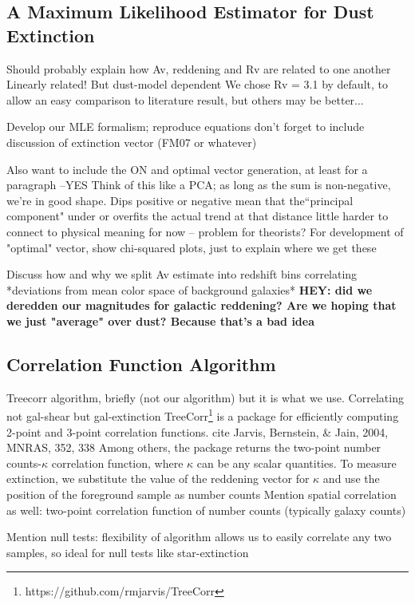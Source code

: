 \documentclass[11pt, oneside]{article}   	%
\begin{document}
\subsection{A Maximum Likelihood Estimator for Dust Extinction}
\begin{outline}
\1 Should probably explain how Av, reddening and Rv are related to one another
\2 Linearly related! But dust-model dependent
\2 We chose Rv = 3.1 by default, to allow an easy comparison to literature result, but others may be better...

\1 Develop our MLE formalism; reproduce equations
	\2 don't forget to include discussion of extinction vector (FM07 or whatever)
	
\1 Also want to include the ON and optimal vector generation, at least for a paragraph --YES
	\2 Think of this like a PCA; as long as the sum is non-negative, we're in good shape. 
	\2 Dips positive or negative mean that the``principal component" under or overfits the actual trend at that distance
		\3 little harder to connect to physical meaning for now -- problem for theorists?
	\2 For development of "optimal" vector, show chi-squared plots, just to explain where we get these 
	
\1 Discuss how and why we split Av estimate into redshift bins
	\2 correlating *deviations from mean color space of background galaxies*
	\2 \textbf{HEY: did we deredden our magnitudes for galactic reddening? Are we hoping that we just "average" over dust? Because that's a bad idea}

\end{outline}

\subsection{Correlation Function Algorithm\label{ssec:treecorr}}
\begin{outline}
\1 Treecorr algorithm, briefly (not our algorithm) but it is what we use. Correlating not gal-shear but gal-extinction
	TreeCorr\footnote{https://github.com/rmjarvis/TreeCorr} is a package for efficiently computing 2-point and 3-point correlation functions. 
	\2 cite Jarvis, Bernstein, \& Jain, 2004, MNRAS, 352, 338
	\2  Among others, the package returns the two-point number counts-$\kappa$ correlation function, where $\kappa$ can be any scalar quantities. To measure extinction, we substitute the value of 		the reddening vector for $\kappa$ and use the position of the foreground sample as number counts
	\2 Mention spatial correlation as well: two-point correlation function of number counts (typically galaxy counts)

\1 Mention null tests: flexibility of algorithm allows us to easily correlate any two samples, so ideal for null tests like star-extinction

\end{outline}
\end{document}
